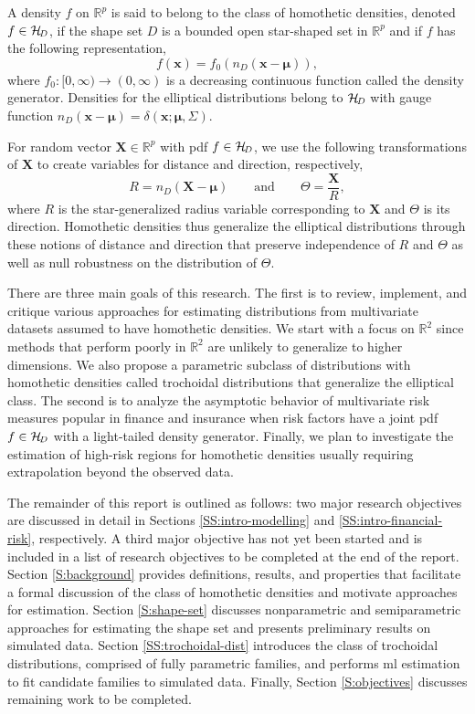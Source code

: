 \documentclass[]{article}
\newcommand{\eeq}[2][]{\begin{equation} \label{Eq:#1} #2 \end{equation}}
\newcommand{\eqq}[2][]{\begin{equation*} #2 \end{equation*}}
\numberwithin{equation}{section}
\newcommand{\de}{\delta} %
\newcommand{\fnc}[2]{#1\!\paren{#2}} %
\newcommand{\HC}[1]{\cal{H}\!_{\mathit{#1}}} %
\newcommand{\mub}{\bm{{\mu}}} %
\newcommand{\nf}{\infty} %
\newcommand{\paren}[1]{\left( #1 \right)} %
\newcommand{\R}{\mathbb{R}} %
\renewcommand{\T}{\Theta} %
\newcommand{\vecl}[1]{\mathbf{#1}}
\newcommand{\Xb}{\vecl{X}}
\newcommand{\xb}{\mathbf{x}}
\begin{document}
A density \(f\) on \(\R^p\) is said to belong to the class of homothetic densities, denoted \(f \in \HC{D}\), if the shape set \(D\) is a bounded open star-shaped set in \(\R^p\) and if \(f\) has the following representation, \eeq[star-pdf]{
  \fnc{f}{\xb} = \fnc{f_0}{\fnc{n_D}{\xb - \mub}},
} where \(f_0:[0, \nf) \to (0, \nf)\) is a decreasing continuous function called the density generator. Densities for the elliptical distributions belong to \(\HC{D}\) with gauge function \(\fnc{n_D}{\xb - \mub} = \fnc{\de}{\xb; \mub, \Sigma}\).

For random vector \(\Xb \in \R^p\) with \ac{pdf} \(f \in \HC{D}\), we use the following transformations of \(\Xb\) to create variables for distance and direction, respectively, \eqq{
  R = \fnc{n_D}{\Xb - \mub} \qquad \text{and} \qquad \T = \frac{\Xb}{R},
} where \(R\) is the star-generalized radius variable \citep{Liebscher2016} corresponding to \(\Xb\) and \(\T\) is its direction. Homothetic densities thus generalize the elliptical distributions through these notions of distance and direction that preserve independence of \(R\) and \(\T\) as well as null robustness on the distribution of \(\T\).

There are three main goals of this research. The first is to review, implement, and critique various approaches for estimating distributions from multivariate datasets assumed to have homothetic densities. We start with a focus on \(\R^2\) since methods that perform poorly in \(\R^2\) are unlikely to generalize to higher dimensions. We also propose a parametric subclass of distributions with homothetic densities called trochoidal distributions that generalize the elliptical class. The second is to analyze the asymptotic behavior of multivariate risk measures popular in finance and insurance when risk factors have a joint \ac{pdf} \(f\in\HC{D}\) with a light-tailed density generator. Finally, we plan to investigate the estimation of high-risk regions for homothetic densities usually requiring extrapolation beyond the observed data.

The remainder of this report is outlined as follows: two major research objectives are discussed in detail in Sections \ref{SS:intro-modelling} and \ref{SS:intro-financial-risk}, respectively. A third major objective has not yet been started and is included in a list of research objectives to be completed at the end of the report. Section \ref{S:background} provides definitions, results, and properties that facilitate a formal discussion of the class of homothetic densities and motivate approaches for estimation. Section \ref{S:shape-set} discusses nonparametric and semiparametric approaches for estimating the shape set and presents preliminary results on simulated data. Section \ref{SS:trochoidal-dist} introduces the class of trochoidal distributions, comprised of fully parametric families, and performs \ac{ml} estimation to fit candidate families to simulated data. Finally, Section \ref{S:objectives} discusses remaining work to be completed.
\end{document}
